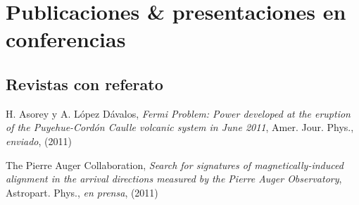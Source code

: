 \documentclass[11pt, a4paper]{article}
\newcommand{\years}[1]{\marginnote{\scriptsize #1}}
\begin{document}
% 
% 
% 

\section*{Publicaciones \& presentaciones en conferencias}

\subsection*{Revistas con referato}
\noindent
\years{2011}H. Asorey y A. López Dávalos, {\emph{Fermi Problem: Power developed at the eruption of the Puyehue-Cordón Caulle volcanic system in June 2011}}, Amer. Jour. Phys., {\emph{enviado}}, (2011)

\years{2011}The Pierre Auger Collaboration, {\emph{Search for signatures
of magnetically-induced alignment in the arrival directions measured by the
Pierre Auger Observatory}}, Astropart. Phys., {\emph{en prensa}}, (2011)
\end{document}
